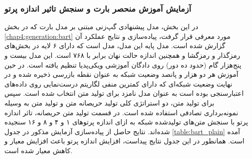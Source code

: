 \subsubsection{آزمایش آموزش منحصر بارت و سنجش تاثیر اندازه پرتو} \label{chap5:bart:plain}
در این بخش،‌ مدل پیشنهادی گپ‌زنی مبتنی بر مدل بارت که در بخش 
\ref{chap4:generation:bart}
مورد معرفی قرار گرفت، پیاده‌سازی و نتایج عملکرد آن گزارش شده است. مدل پایه این مدل، مدل 
است که دارای ۶ لایه در بخش‌های رمزگذار و رمزگشا و همچنین اندازه حالت نهان برابر با ۷۶۸ است. این مدل بیست و پنج‌هزار گام (حدود ده دور) روی دادگان آموزشی ویکی‌پدیا تنظیم یافته است. 
در حین آموزش هر دو هزار و پانصد وضعیت شبکه به عنوان نقطه بازرسی ذخیره شده و در نهایت وضعیت شبکه‌ای که دارای کمترین منفی لگاریتم درست‌نمایی روی داده‌های اعتبارسنجی بوده است به عنوان مدل نامزد برای تولید متن انتخاب شده است. 
سپس برای تولید متن،‌ دو استراتژی کلی تولید حریصانه متن و تولید متن به وسیله نمونه‌برداری تصادفی استفاده شده است. در قسمت تولید متن حریصانه، تاثر اندازه پرتو با سنجش متن‌های تولید‌شده شبکه به ازای اندازه پرتو‌های ۱ و ۴ و ۸ و ۱۶ سنجیده شده‌اند. نتایج حاصل از پیاده‌سازی آزمایش مذکور در جدول 
\ref{table:bart_plain}
آمده است. همانطور در این جدول نتایج پیداست، افزایش اندازه پرتو باعث افزایش معیار
و کاهش معیار 
شده است.



